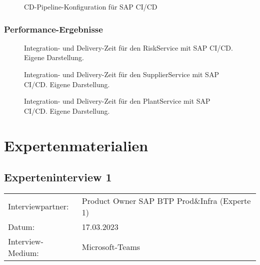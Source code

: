 \begin{center}
	\begin{figure}[H]
		\centering
		\caption[]{CD-Pipeline-Konfiguration für SAP CI/CD }
		\label{fig:S_IMPl_CD}
	\end{figure}
\end{center}

\subsubsection{Performance-Ergebnisse}

\begin{center}
	\begin{figure}[H]
		\centering
		\caption[]{Integration- und Delivery-Zeit für den RiskService mit SAP CI/CD. Eigene Darstellung.}
		\label{fig:SP_Risk}
	\end{figure}
\end{center}

\begin{center}
	\begin{figure}[H]
		\centering
		\caption[]{Integration- und Delivery-Zeit für den SupplierService mit SAP CI/CD. Eigene Darstellung.}
		\label{fig:SP_Supplier}
	\end{figure}
\end{center}
\begin{center}
	\begin{figure}[H]
		\centering
		\caption[]{Integration- und Delivery-Zeit für den PlantService mit SAP CI/CD. Eigene Darstellung.}
		\label{fig:SP_Plant}
	\end{figure}
\end{center}




\newpage
\section{Expertenmaterialien}
\label{sec:Expertenmaterialien}

\subsection{Experteninterview 1}
	\begin{tabular}{ l l }
		Interviewpartner: & Product Owner SAP BTP Prod\&Infra (Experte 1)\\
		Datum: & 17.03.2023\\
		Interview-Medium: & Microsoft-Teams\\
\end{tabular}\\\\

